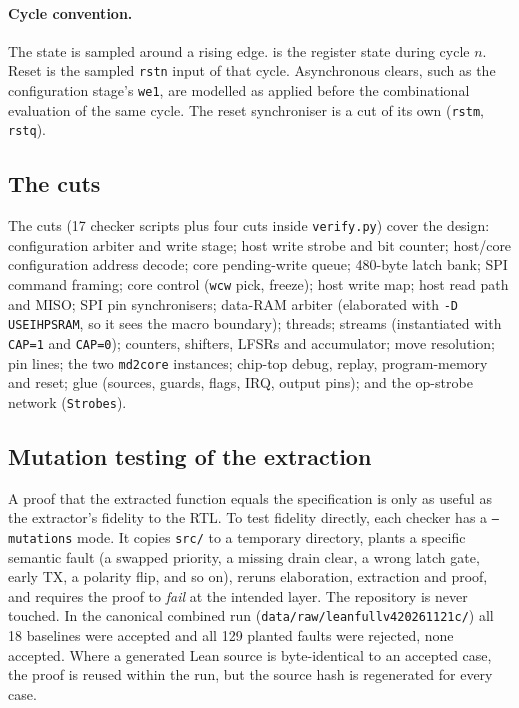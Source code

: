 \documentclass[11pt,a4paper]{article}
\newcommand{\brkus}{\textunderscore\allowbreak}
\newcommand{\code}[1]{{\let\_\brkus\texttt{#1}}}
\newcommand{\lean}[1]{\texttt{\detokenize{#1}}}
\begin{document}
\paragraph{Cycle convention.} The state is sampled around a rising edge.
\lean{stateAt inputs initial n} is the register state during cycle $n$. Reset
is the sampled \code{rst\_n} input of that cycle. Asynchronous clears, such as
the configuration stage's \code{we1}, are modelled as applied before the
combinational evaluation of the same cycle. The reset synchroniser is a cut of
its own (\code{rst\_m}, \code{rst\_q}).

\subsection{The cuts}

The cuts (17 checker scripts plus four cuts inside \code{verify.py}) cover
the design:
configuration arbiter and write stage; host write strobe and bit counter;
host/core configuration address decode; core pending-write queue; 480-byte
latch bank; SPI command framing; core control (\code{w\_cw} pick, freeze);
host write map; host read path and MISO; SPI pin synchronisers; data-RAM
arbiter (elaborated with \code{-D USE\_IHP\_SRAM}, so it sees the macro
boundary); threads; streams (instantiated with \code{CAP=1} and \code{CAP=0});
counters, shifters, LFSRs and accumulator; move resolution; pin lines; the two
\code{md2\_core} instances; chip-top debug, replay, program-memory and reset;
glue (sources, guards, flags, IRQ, output pins); and the op-strobe network
(\code{Strobes}).

\subsection{Mutation testing of the extraction}

A proof that the extracted function equals the specification is only as useful
as the extractor's fidelity to the RTL. To test fidelity directly, each
checker has a \code{--mutations} mode. It copies \code{src/} to a temporary
directory, plants a specific semantic fault (a swapped priority, a missing
drain clear, a wrong latch gate, early TX, a polarity flip, and so on), reruns
elaboration, extraction and proof, and requires the proof to \emph{fail} at
the intended layer. The repository is never touched. In the canonical combined
run (\code{data/raw/lean\_full\_v4\_20261121c/}) all 18 baselines were accepted
and all 129 planted faults were rejected, none accepted. Where a generated Lean
source is byte-identical to an accepted case, the proof is reused within the
run, but the source hash is regenerated for every case.
\end{document}
